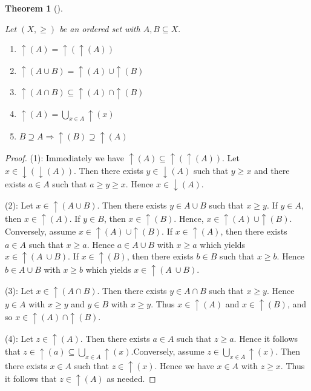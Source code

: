 \documentclass[
  letterpaper,
  10pt,
  reqno,
  twopage,
  openany]{book}
\providecommand{\tightlist}{%
  \setlength{\itemsep}{0pt}\setlength{\parskip}{0pt}}\usepackage{longtable,booktabs,array}
\theoremstyle{plain}
\theoremstyle{definition}
\theoremstyle{definition}
\theoremstyle{definition}
\theoremstyle{plain}
\theoremstyle{plain}
\newtheorem{theorem}{Theorem}[chapter]
\theoremstyle{remark}
\begin{document}
\leavevmode{}%
\begin{theorem}[]\label{thm-mupprop}

Let \((X,\geq)\) be an ordered set with \(A,B\subseteq X.\)

\begin{enumerate}
\def\labelenumi{\arabic{enumi}.}
\tightlist
\item
  \({\uparrow}(A)={\uparrow}({\uparrow}(A))\)
\item
  \({\uparrow}(A\cup B)={\uparrow}(A)\ \cup {\uparrow}(B)\)
\item
  \({\uparrow}(A\cap B)\subseteq {\uparrow}(A)\ \cap {\uparrow}(B)\)
\item
  \({\uparrow}(A)=\bigcup_{x\in A} {\uparrow}(x)\)
\item
  \(B\supseteq A\Rightarrow {\uparrow}(B)\supseteq {\uparrow}(A)\)
\end{enumerate}

\end{theorem}

\begin{proof}

(1): Immediately we have
\({\uparrow}(A)\subseteq {\uparrow}({\uparrow}(A)).\) Let
\(x\in {\downarrow}({\downarrow}(A)).\) Then there exists
\(y\in{\downarrow}(A)\) such that \(y\geq x\) and there exists
\(a\in A\) such that \(a\geq y\geq x.\) Hence \(x\in {\downarrow}(A)\).

(2): Let \(x\in {\uparrow}(A\cup B).\) Then there exists
\(y\in A\cup B\) such that \(x\geq y.\) If \(y\in A\), then
\(x\in {\uparrow}(A).\) If \(y\in B\), then \(x\in {\uparrow}(B).\)
Hence, \(x\in {\uparrow}(A)\ \cup {\uparrow}(B).\) Conversely, assume
\(x\in {\uparrow}(A) \ \cup {\uparrow}(B).\) If \(x\in {\uparrow}(A)\),
then there exists \(a\in A\) such that \(x \geq a.\) Hence
\(a\in A\cup B\) with \(x\geq a\) which yields
\(x\in {\uparrow}(A\ \cup B).\) If \(x\in {\uparrow}(B)\), then there
exists \(b\in B\) such that \(x \geq b.\) Hence \(b\in A\cup B\) with
\(x\geq b\) which yields \(x\in {\uparrow}(A\ \cup B)\).

(3): Let \(x\in {\uparrow}(A\cap B).\) Then there exists
\(y\in A\cap B\) such that \(x\geq y.\) Hence \(y\in A\) with
\(x\geq y\) and \(y\in B\) with \(x\geq y.\) Thus \(x\in {\uparrow}(A)\)
and \(x\in {\uparrow}(B)\), and so
\(x\in {\uparrow}(A)\ \cap {\uparrow}(B).\)

(4): Let \(z\in {\uparrow}(A).\) Then there exists \(a\in A\) such that
\(z\geq a.\) Hence it follows that
\(z\in {\uparrow}(a)\subseteq \bigcup_{x\in A} {\uparrow}(x)\).Conversely,
assume \(z\in \bigcup_{x\in A} {\uparrow}(x).\) Then there exists
\(x\in A\) such that \(z\in {\uparrow}(x).\) Hence we have \(x\in A\)
with \(z\geq x.\) Thus it follows that \(z\in {\uparrow}(A)\) as needed.

\end{proof}
\end{document}
